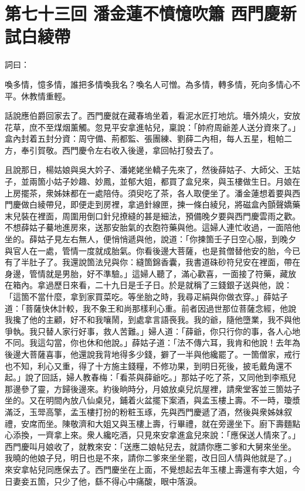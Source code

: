 
\chapter*{第七十三回 潘金蓮不憤憶吹簫 西門慶新試白綾帶}


詞曰：

\begin{myquote}
喚多情，憶多情，誰把多情喚我名？喚名人可憎。為多情，轉多情，死向多情心不平。休教情重輕。

\end{myquote}

話說應伯爵回家去了。西門慶就在藏春塢坐着，看泥水匠打地炕。墻外燒火，安放花草，庶不至煤烟薰觸。忽見平安拿進帖兒，稟說：「帥府周爺差人送分資來了。」盒內封着五封分資：周守備、荊都監、張團練、劉薛二內相，每人五星，粗帕二方，奉引賀敬。西門慶令左右收入後邊，拿回帖打發去了。

且說那日，楊姑娘與吳大妗子、潘姥姥坐轎子先來了，然後薛姑子、大師父、王姑子，並兩箇小姑子妙趣、妙鳳，並郁大姐，都買了盒兒來，與玉樓做生日。月娘在上房擺茶，衆姊妹都在一處陪侍。須臾吃了茶，各人取便坐了。潘金蓮想着要與西門慶做白綾帶兒，即便走到房裡，拿過針線匣，揀一條白綾兒，將磁盒內顫聲嬌藥末兒裝在裡面，周圍用倒口針兒撩縫的甚是細法，預備晚夕要與西門慶雲雨之歡。不想薛姑子驀地進房來，送那安胎氣的衣胞符藥與他。這婦人連忙收過，一面陪他坐的。薛姑子見左右無人，便悄悄遞與他，{}說道：「你揀箇壬子日空心服，到晚夕與官人在一處，管情一度就成胎氣。你看後邊大菩薩，也是貧僧替他安的胎，今已有了半肚子了。我還說箇法兒與你：縫箇錦香囊，我書道硃砂符兒安在裡面，帶在身邊，管情就是男胎，好不準驗。」{}這婦人聽了，滿心歡喜，一面接了符藥，藏放在箱內。拿過歷日來看，二十九日是壬子日。於是就稱了三錢銀子送與他，說：「這箇不當什麼，拿到家買菜吃。等坐胎之時，我尋疋絹與你做衣穿。」薛姑子道：「菩薩快休計較，我不象王和尚那樣利心重。{}前者因過世那位菩薩念經，他說我攙了他的主顧，好不和我嚷鬧，到處拿言語䘮我。我的爺，隨他墮業，我不與他爭執。我只替人家行好事，救人苦難。」婦人道：「薛爺，你只行你的事，各人心地不同。我這勾當，你也休和他說。」薛姑子道：「法不傳六耳，我肯和他說！去年為後邊大菩薩喜事，他還說我背地得多少錢，擗了一半與他纔罷了。一箇僧家，戒行也不知，利心又重，得了十方施主錢糧，不修功果，到明日死後，披毛戴角還不起。」說了回話，婦人教春梅：「看茶與薛爺吃。」那姑子吃了茶，又同他到李瓶兒那邊參了靈，方歸後邊來。約後晌時分，月娘放桌兒炕屋裡，請衆堂客並三箇姑子坐的。又在明間內放八仙桌兒，鋪着火盆擺下案酒，與孟玉樓上壽。不一時，瓊漿滿泛，玉斝高擎，孟玉樓打扮的粉粧玉琢，先與西門慶遞了酒，然後與衆姊妹叙禮，安席而坐。陳敬濟和大姐又與玉樓上壽，行畢禮，就在旁邊坐下。廚下壽麵點心添換，一齊拿上來。衆人纔吃酒，只見來安拿進盒兒來說：「應保送人情來了。」西門慶叫月娘收了，就教來安：「送應二娘帖兒去，就請你應二爹和大舅來坐坐。我曉的他娘子兒，明日也是不來，請你二爹來坐坐罷，改日回人情與他就是了。」來安拿帖兒同應保去了。西門慶坐在上面，不覺想起去年玉樓上壽還有李大姐，今日妻妾五箇，只少了他，繇不得心中痛酸，眼中落淚。{}

